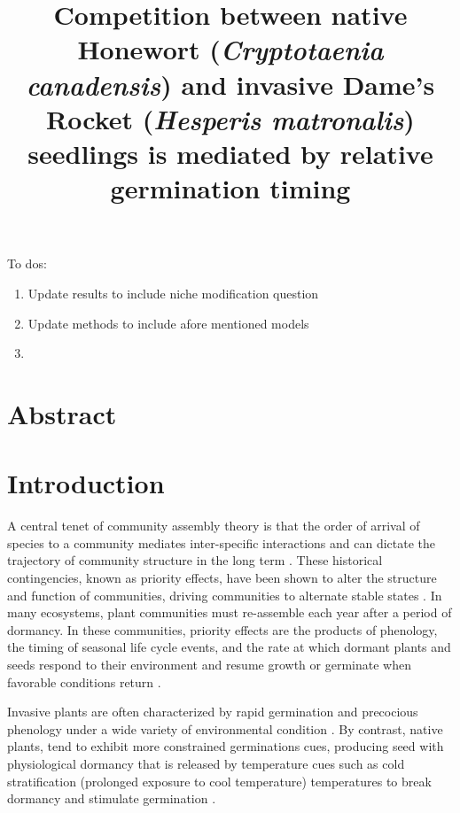 \documentclass{article}\usepackage[]{graphicx}\usepackage[]{color}
\title{Competition between native Honewort (\textit{Cryptotaenia canadensis}) and invasive Dame's Rocket (\textit{Hesperis matronalis}) seedlings is mediated by relative germination timing}
\begin{document}
\maketitle


To dos:
\begin{enumerate}
\item Update results to include niche modification question
\item Update methods to include afore mentioned models
\item
\end{enumerate}
\section*{Abstract}
\section*{Introduction}
 A central tenet of community assembly theory is that the order of arrival of species to a community mediates inter-specific interactions and can dictate the trajectory of community structure in the long term \citep{Fukami2015}. These historical contingencies, known as priority effects, have been shown to alter the structure and function of communities, driving communities to alternate stable states \citep{Fukami2011}. In many ecosystems, plant communities must re-assemble each year after a period of dormancy. In these communities, priority effects are the products of phenology, the timing of seasonal life cycle events, and the rate at which dormant plants and seeds respond to their environment and resume growth or germinate when favorable conditions return \citep{Rudolf:2019aa}.%

Invasive plants are often characterized by rapid germination and precocious phenology under a wide variety of environmental condition \citep{Gioria2018,Gioria:2017wo,Wolkovich:2011uh,Smith:2013uj}. By contrast, native plants, tend to exhibit more constrained germinations cues\citep{Marushia:2010ug}, producing seed with physiological dormancy that is released by temperature cues such as cold stratification (prolonged exposure to cool temperature) temperatures to break dormancy and stimulate germination \citep{Brink:2013wr,Cavieres:2017aa,Bradford:2007tj} .%
\end{document}
